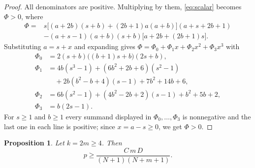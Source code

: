 \documentclass[11pt]{amsart}
\newtheorem{proposition}[theorem]{Proposition}
\theoremstyle{definition}
\theoremstyle{remark}
\numberwithin{equation}{section}
\begin{document}
\begin{proof}
All denominators are positive. Multiplying by them, \eqref{eq:scalar} becomes $\Phi>0$, where
\begin{align*}
\Phi={}&s\bigl[(a+2b)(s+b)+(2b+1)a(a+b)\bigr](a+s+2b+1)\\
&-(a+s-1)(a+b)(s+b)\bigl[a+2b+(2b+1)s\bigr].
\end{align*}
Substituting $a=s+x$ and expanding gives $\Phi=\Phi_0+\Phi_1x+\Phi_2x^2+\Phi_3x^3$ with
\begin{align*}
\Phi_0&=2(s+b)\bigl((b+1)s+b\bigr)(2s+b),\\
\Phi_1&=4b(s^3-1)+(6b^2+2b+6)(s^2-1)\\
&\quad+2b(b^2-b+4)(s-1)+7b^2+14b+6,\\
\Phi_2&=6b(s^2-1)+(4b^2-2b+2)(s-1)+b^2+5b+2,\\
\Phi_3&=b(2s-1).
\end{align*}
For $s\ge1$ and $b\ge1$ every summand displayed in $\Phi_0,\dots,\Phi_3$ is nonnegative and the last one in each line is positive; since $x=a-s\ge0$, we get $\Phi>0$.
\end{proof}

\begin{proposition}\label{prop:lowerbound}
Let $k=2m\ge4$. Then
\begin{equation}\label{eq:pbound}
p\ge\frac{C\,m\,D}{(N+1)(N+m+1)} .
\end{equation}
\end{proposition}
\end{document}
